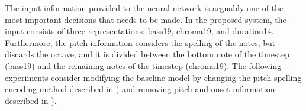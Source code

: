 
The input information provided to the neural network is
arguably one of the most important decisions that needs to
be made. In the proposed system, the input consists of three
representations: \gls{bass19}, \gls{chroma19}, and
\gls{duration14}. Furthermore, the pitch information
considers the spelling of the notes, but discards the
octave, and it is divided between the bottom note of the
timestep (\gls{bass19}) and the remaining notes of the
timestep (\gls{chroma19}). The following experiments
consider modifying the baseline model by changing the pitch
spelling encoding method described in
) and removing
pitch and onset information described in
).
